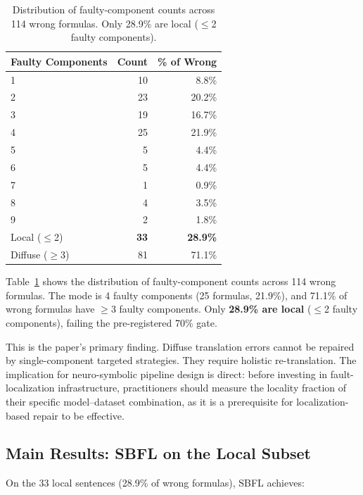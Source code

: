 \documentclass[11pt,letterpaper]{article}
\begin{document}
\begin{table}[!htbp]
  \centering
  \caption{Distribution of faulty-component counts across 114 wrong formulas. Only 28.9\% are local ($\leq$2 faulty components).}
  \label{tab:locality}
  \begin{tabular}{lrr}
    \toprule
    Faulty Components & Count & \% of Wrong \\
    \midrule
    1 & 10 & 8.8\% \\
    2 & 23 & 20.2\% \\
    3 & 19 & 16.7\% \\
    4 & 25 & 21.9\% \\
    5 & 5  & 4.4\% \\
    6 & 5  & 4.4\% \\
    7 & 1  & 0.9\% \\
    8 & 4  & 3.5\% \\
    9 & 2  & 1.8\% \\
    \midrule
    Local ($\leq$2) & \textbf{33} & \textbf{28.9\%} \\
    Diffuse ($\geq$3) & 81 & 71.1\% \\
    \bottomrule
  \end{tabular}
\end{table}

Table~\ref{tab:locality} shows the distribution of faulty-component counts across 114 wrong formulas. The mode is 4 faulty components (25 formulas, 21.9\%), and 71.1\% of wrong formulas have $\geq$3 faulty components. Only \textbf{28.9\% are local} ($\leq$2 faulty components), failing the pre-registered 70\% gate.

This is the paper's primary finding. Diffuse translation errors cannot be repaired by single-component targeted strategies. They require holistic re-translation. The implication for neuro-symbolic pipeline design is direct: before investing in fault-localization infrastructure, practitioners should measure the locality fraction of their specific model--dataset combination, as it is a prerequisite for localization-based repair to be effective.

\subsection{Main Results: SBFL on the Local Subset}

On the 33 local sentences (28.9\% of wrong formulas), SBFL achieves:
\end{document}
